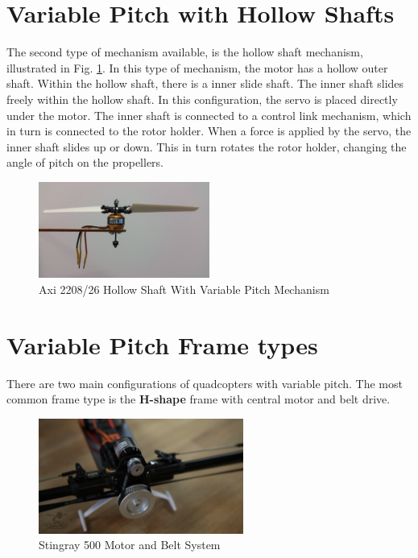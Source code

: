 \section{Variable Pitch with Hollow Shafts}
The second type of mechanism available, is the hollow shaft mechanism, illustrated in Fig. \ref{fig:Axi220826}. In this type of mechanism, the motor has a hollow outer shaft. Within the hollow shaft, there is a inner slide shaft. The inner shaft slides freely within the hollow shaft. In this configuration, the servo is placed directly under the motor. The inner shaft is connected to a control link mechanism, which in turn is connected to the rotor holder. When a force is applied by the servo, the inner shaft slides up or down. This in turn rotates the rotor holder, changing the angle of pitch on the propellers. 

\begin{figure}[H]
\centering
    \includegraphics[width = 0.5\textwidth]{VAPIQ-PICTURES/Axi2208}
    \caption{Axi 2208/26 Hollow Shaft With Variable Pitch Mechanism}
    \label{fig:Axi220826}    
\end{figure}

\clearpage
\section {Variable Pitch Frame types}
There are two main configurations of quadcopters with variable pitch. The most common frame type is the \textbf{H-shape} frame with central motor and belt drive. 

\begin{figure}[H]
\centering
    \includegraphics[width = 0.6\textwidth]{VAPIQ-PICTURES/hcop}
    \caption{Stingray 500 Motor and Belt System \cite{flitetest}}
    \label{fig:hcop}    
\end{figure}

